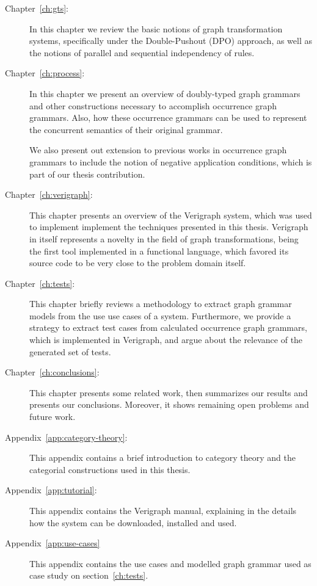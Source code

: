 \begin{description}
  \item[Chapter~\ref{ch:gts}:] In this chapter we review the basic notions of graph transformation systems, specifically under the Double-Pushout (DPO) approach, as well as the notions of parallel and sequential independency of rules.

  \item[Chapter~\ref{ch:process}:] In this chapter we present an overview of doubly-typed graph grammars and other constructions necessary to accomplish occurrence graph grammars. Also, how these occurrence grammars can be used to represent the concurrent semantics of their original grammar.

    We also present out extension to previous works in occurrence graph grammars to include the notion of negative application conditions, which is part of our thesis contribution.

  \item[Chapter~\ref{ch:verigraph}:] This chapter presents an overview of the Verigraph system, which was used to implement implement the techniques presented in this thesis. Verigraph in itself represents a novelty in the field of graph transformations, being the first tool implemented in a functional language, which favored its source code to be very close to the problem domain itself.

  \item[Chapter~\ref{ch:tests}:] This chapter briefly reviews a methodology to extract graph grammar models from the use use cases of a system. Furthermore, we provide a strategy to extract test cases from calculated occurrence graph grammars, which is implemented in Verigraph, and argue about the relevance of the generated set of tests.

  \item[Chapter~\ref{ch:conclusions}:] This chapter presents some related work, then summarizes our results and presents our conclusions. Moreover, it shows remaining open problems and future work.

  \item[Appendix~\ref{app:category-theory}:] This appendix contains a brief introduction to category theory and the categorial constructions used in this thesis.

  \item[Appendix~\ref{app:tutorial}:] This appendix contains the Verigraph manual, explaining in the details how the system can be downloaded, installed and used.

  \item[Appendix~\ref{app:use-cases}] This appendix contains the use cases and modelled graph grammar used as case study on section~\ref{ch:tests}.
\end{description}
